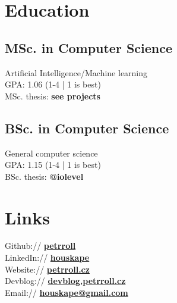 \documentclass[a4paper]{deedy-resume} %
\begin{document}
\begin{minipage}[t]{0.33\textwidth} %


\section{Education} 

\subsection{MSc. in Computer Science}
Artificial Intelligence/Machine learning \\
GPA: 1.06 (1-4 | 1 is best) \\
MSc. thesis:  {\bf see projects}

\halfsectionspace %

\subsection{BSc. in Computer Science}
General computer science \\
GPA: 1.15 (1-4 | 1 is best) \\
BSc. thesis: {\bf @iolevel}

\sectionspace %


\section{Links} 

Github:// \href{https://github.com/petrroll}{\bf petrroll} \\
LinkedIn:// \href{https://www.linkedin.com/in/houskape}{\bf houskape} \\
Website:// \href{https://www.petrroll.cz}{\bf petrroll.cz} \\
Devblog:// \href{https://devblog.petrroll.cz/}{\bf devblog.petrroll.cz} \\
Email:// \href{mailto:houskape@gmail.com}{\bf houskape@gmail.com} \\


\end{minipage}
\end{document}
